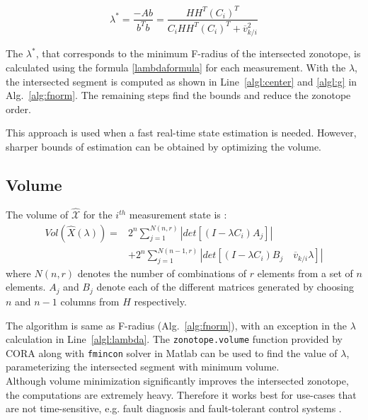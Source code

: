 \begin{equation}
\label{lambdaformula}
\lambda^* = \frac{-Ab }{b^Tb}  = \frac{HH^T(C_i)^T}{C_i HH^T(C_i)^T + \overline{v}_{k/i}^2} 
\end{equation}

The $\lambda^*$, that corresponds to the minimum F-radius of the intersected zonotope, is calculated using the formula \eqref{lambdaformula} for each measurement. With the $\lambda$, the intersected segment is computed as shown in Line~\ref{algl:center} and \ref{algl:g} in Alg.~\ref{alg:fnorm}. The remaining steps find the bounds and reduce the zonotope order. 

This approach is used when a fast real-time state estimation is needed. However, sharper bounds of estimation can be obtained by optimizing the volume.

\subsection{Volume}
The volume of $\mathcal{\hat{X}}$ for the $i^{th}$ measurement state is \cite{Alamo2005}:
\begin{equation}
\label{volumeformula}
\begin{split}
Vol(\hat{X}(\lambda))=& 2^n \sum^{N(n,r)}_{j=1} |det[(I - \lambda C_i)A_j]|\\
&+ 2^n \sum^{N(n-1,r)}_{j=1} |det[(I- \lambda C_i)B_j\quad \overline{v}_{k/i}\lambda]|
\end{split}
\end{equation}
where $N(n,r)$ denotes the number of combinations of $r$ elements from a set of $n$ elements. $A_j$ and $B_j$ denote each of the different matrices generated by choosing $n$ and $n-1$ columns from $H$ respectively. 

The algorithm is same as F-radius (Alg.~\ref{alg:fnorm}), with an exception in the $\lambda$ calculation in Line~\ref{algl:lambda}. The \texttt{zonotope.volume} function provided by CORA along with \texttt{fmincon} solver in Matlab\textsuperscript{\tiny\textregistered}  can be used to find the value of $\lambda$, parameterizing the intersected segment with minimum volume. \\
Although volume minimization significantly improves the intersected zonotope, the computations are extremely heavy. Therefore it works best for use-cases that are not time-sensitive, e.g. fault diagnosis and fault-tolerant control systems \cite{Puig2010}. 
